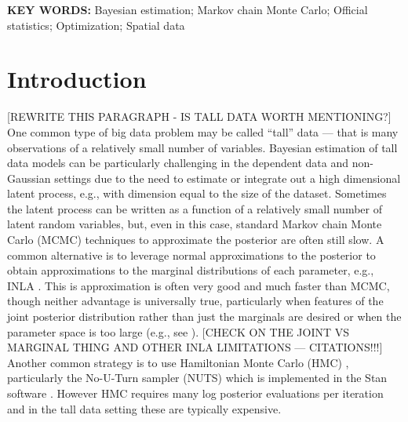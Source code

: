 \documentclass[12pt]{article}
\begin{document}
\baselineskip=12pt
\par\vfill\noindent
{\bf KEY WORDS:} 
Bayesian estimation; Markov chain Monte Carlo; Official statistics; Optimization; Spatial data
\par\medskip\noindent


\clearpage\pagebreak\newpage {}
\baselineskip=24pt

\section{Introduction}

[REWRITE THIS PARAGRAPH - IS TALL DATA WORTH MENTIONING?]
One common type of big data problem may be called ``tall'' data --- that is many observations of a relatively small number of variables. Bayesian estimation of tall data models can be particularly challenging in the dependent data and non-Gaussian settings due to the need to estimate or integrate out a high dimensional latent process, e.g., with dimension equal to the size of the dataset. Sometimes the latent process can be written as a function of a relatively small number of latent random variables, but, even in this case, standard Markov chain Monte Carlo (MCMC) techniques to approximate the posterior are often still slow. A common alternative is to leverage normal approximations to the posterior to obtain approximations to the marginal distributions of each parameter, e.g., INLA \citep{rue2009approximate}. This is approximation is often very good and much faster than MCMC, though neither advantage is universally true, particularly when features of the joint posterior distribution rather than just the marginals are desired or when the parameter space is too large (e.g., see \citet{taylor2014inla}). [CHECK ON THE JOINT VS MARGINAL THING AND OTHER INLA LIMITATIONS --- CITATIONS!!!] Another common strategy is to use Hamiltonian Monte Carlo (HMC) \citep{neal2011mcmc}, particularly the No-U-Turn sampler (NUTS) \citep{homan2014no} which is implemented in the Stan software \citep{carpenter2015stan}. However HMC requires many log posterior evaluations per iteration and in the tall data setting these are typically expensive.
\end{document}
